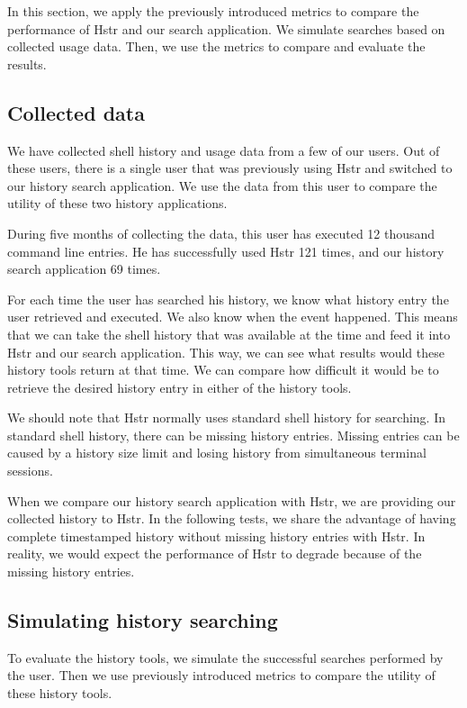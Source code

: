 In this section, we apply the previously introduced metrics to compare the performance of Hstr and our search application. We simulate searches based on collected usage data. Then, we use the metrics to compare and evaluate the results. 

\subsection{Collected data}

We have collected shell history and usage data from a few of our users. Out of these users, there is a single user that was previously using Hstr and switched to our history search application. We use the data from this user to compare the utility of these two history applications.

During five months of collecting the data, this user has executed 12 thousand command line entries. He has successfully used Hstr 121 times, and our history search application 69 times. 

For each time the user has searched his history, we know what history entry the user retrieved and executed. We also know when the event happened. This means that we can take the shell history that was available at the time and feed it into Hstr and our search application. This way, we can see what results would these history tools return at that time. We can compare how difficult it would be to retrieve the desired history entry in either of the history tools. 

We should note that Hstr normally uses standard shell history for searching. In standard shell history, there can be missing history entries. Missing entries can be caused by a history size limit and losing history from simultaneous terminal sessions.

When we compare our history search application with Hstr, we are providing our collected history to Hstr. In the following tests, we share the advantage of having complete timestamped history without missing history entries with Hstr. In reality, we would expect the performance of Hstr to degrade because of the missing history entries.

\subsection{Simulating history searching}

To evaluate the history tools, we simulate the successful searches performed by the user. Then we use previously introduced metrics to compare the utility of these history tools.

